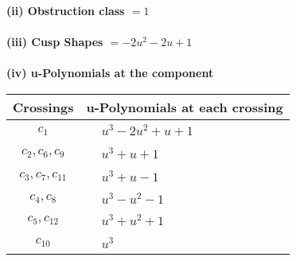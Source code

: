 \documentclass[1p]{elsarticle_modified}
\theoremstyle{definition}
\begin{document}
\flushleft \textbf{(ii) Obstruction class $= 1$}\\~\\
\flushleft \textbf{(iii) Cusp Shapes $= -2 u^2-2 u+1$}\\~\\
\newpage\renewcommand{\arraystretch}{1}
\flushleft \textbf{(iv) u-Polynomials at the component}\newline \\
\begin{tabular}{m{50pt}|m{274pt}}
Crossings & \hspace{64pt}u-Polynomials at each crossing \\
\hline $$\begin{aligned}c_{1}\end{aligned}$$&$\begin{aligned}
&u^3-2 u^2+u+1
\end{aligned}$\\
\hline $$\begin{aligned}c_{2},c_{6},c_{9}\end{aligned}$$&$\begin{aligned}
&u^3+u+1
\end{aligned}$\\
\hline $$\begin{aligned}c_{3},c_{7},c_{11}\end{aligned}$$&$\begin{aligned}
&u^3+u-1
\end{aligned}$\\
\hline $$\begin{aligned}c_{4},c_{8}\end{aligned}$$&$\begin{aligned}
&u^3- u^2-1
\end{aligned}$\\
\hline $$\begin{aligned}c_{5},c_{12}\end{aligned}$$&$\begin{aligned}
&u^3+u^2+1
\end{aligned}$\\
\hline $$\begin{aligned}c_{10}\end{aligned}$$&$\begin{aligned}
&u^3
\end{aligned}$\\
\hline
\end{tabular}\\~\\
\newpage\renewcommand{\arraystretch}{1}
\end{document}
